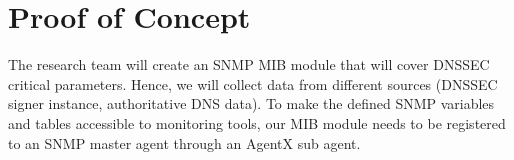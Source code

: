 \section{Proof of Concept}
\label{chap:proof_of_concept}
The research team will create an SNMP MIB module that will cover DNSSEC critical parameters. Hence, we will collect data from different sources (DNSSEC signer instance, authoritative DNS data). To make the defined SNMP variables and tables accessible to monitoring tools, our MIB module needs to be registered to an SNMP master agent through an AgentX \cite{agentx} sub agent.



